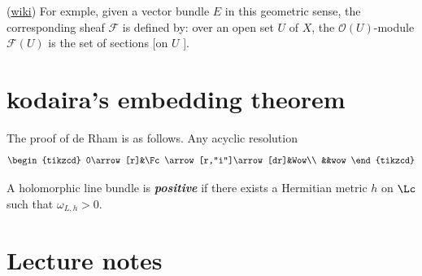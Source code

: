 \begin{remark}
	(\href{https://en.wikipedia.org/wiki/Coherent_sheaf#Basic_constructions_of_coherent_sheaves}{wiki}) For exmple, given a vector bundle $E$ in this geometric sense, the corresponding sheaf $\mathcal{F}$ is defined by: over an open set $U$ of $X$, the $\mathcal{O}(U)$-module $\mathcal{F}(U)$ is the set of sections [on  $U$ ].
\end{remark}

\section{kodaira's embedding theorem}
The proof of de Rham is as follows.
Any acyclic resolution
\[\begin{tikzcd}
	0\arrow[r]&\Fc\arrow[r,"i"]\arrow[dr]&Wow\\
	&&wow
\end{tikzcd}\]

\begin{defn}
	A holomorphic line bundle is \textbf{\textit{positive}} if there exists a Hermitian metric $h$ on $\Lc$ such that $\omega_{L,h}>0$.
\end{defn}
\clearpage

\section{Lecture notes}

